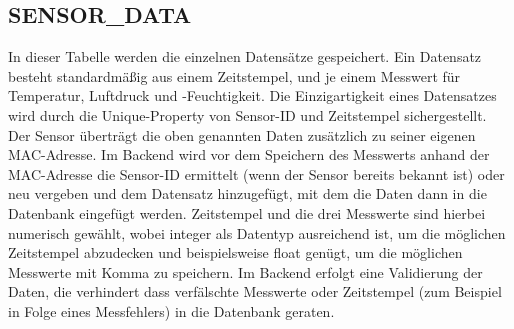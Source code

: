 \subsection*{SENSOR\_DATA}
In dieser Tabelle werden die einzelnen Datensätze gespeichert.
Ein Datensatz besteht standardmäßig aus einem Zeitstempel, und je einem Messwert für Temperatur, Luftdruck und -Feuchtigkeit.
Die Einzigartigkeit eines Datensatzes wird durch die Unique-Property von Sensor-ID und Zeitstempel sichergestellt.
Der Sensor überträgt die oben genannten Daten zusätzlich zu seiner eigenen MAC-Adresse.
Im Backend wird vor dem Speichern des Messwerts anhand der MAC-Adresse die Sensor-ID ermittelt (wenn der Sensor bereits bekannt ist) oder neu vergeben und dem Datensatz hinzugefügt, mit dem die Daten dann in die Datenbank eingefügt werden.
Zeitstempel und die drei Messwerte sind hierbei numerisch gewählt, wobei integer als Datentyp ausreichend ist, um die möglichen Zeitstempel abzudecken und beispielsweise float genügt, um die möglichen Messwerte mit Komma zu speichern.
Im Backend erfolgt eine Validierung der Daten, die verhindert dass verfälschte Messwerte oder Zeitstempel (zum Beispiel in Folge eines Messfehlers) in die Datenbank geraten.\\